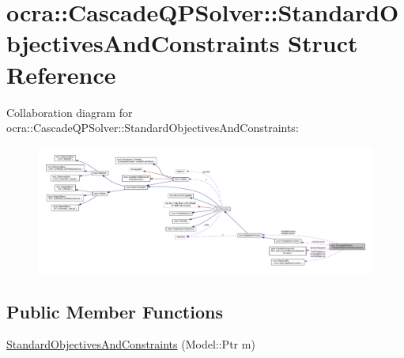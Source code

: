 \hypertarget{structocra_1_1CascadeQPSolver_1_1StandardObjectivesAndConstraints}{}\section{ocra\+:\+:Cascade\+Q\+P\+Solver\+:\+:Standard\+Objectives\+And\+Constraints Struct Reference}
\label{structocra_1_1CascadeQPSolver_1_1StandardObjectivesAndConstraints}


Collaboration diagram for ocra\+:\+:Cascade\+Q\+P\+Solver\+:\+:Standard\+Objectives\+And\+Constraints\+:
\nopagebreak
\begin{figure}[H]
\begin{center}
\leavevmode
\includegraphics[width=350pt]{dc/d17/structocra_1_1CascadeQPSolver_1_1StandardObjectivesAndConstraints__coll__graph}
\end{center}
\end{figure}
\subsection*{Public Member Functions}
\begin{DoxyCompactItemize}
\item 
\hyperlink{structocra_1_1CascadeQPSolver_1_1StandardObjectivesAndConstraints_afa2f8a2043316e306b16bb8edb26b6f4}{Standard\+Objectives\+And\+Constraints} (Model\+::\+Ptr m)
\end{DoxyCompactItemize}
